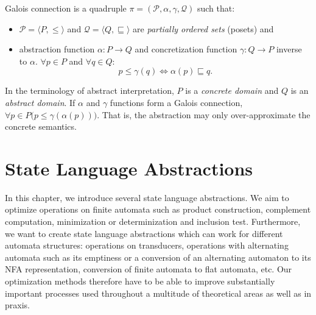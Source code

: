 \begin{definition} \hfill \newline
Galois connection is a quadruple $\pi = (\mathcal{P}, \alpha, \gamma, \mathcal{Q})$ such that:

\begin{itemize}
    \item $\mathcal{P} = \langle P, \leq \rangle$ and $\mathcal{Q} = \langle Q, \sqsubseteq \rangle$ are \emph{partially ordered sets} (posets) and
    \item abstraction function $\alpha : P \rightarrow Q$ and concretization function $\gamma : Q \rightarrow P$ inverse to $\alpha$. $\forall p \in P$ and $\forall q \in Q$:
    \[
        p \leq \gamma(q) \Leftrightarrow \alpha(p) \sqsubseteq q \text{.}
    \]
\end{itemize}

\end{definition}

In the terminology of abstract interpretation, $P$ is a \emph{concrete domain} and $Q$ is an \emph{abstract domain}. If $\alpha$ and $\gamma$ functions form a Galois connection, $\forall p \in P \bigr( p \leq \gamma(\alpha(p)) \bigr)$. That is, the abstraction may only over-approximate the concrete semantics.


\chapter{State Language Abstractions}

In this chapter, we introduce several state language abstractions. We aim to optimize operations on finite automata such as product construction, complement computation, minimization or determinization and inclusion test. Furthermore, we want to create state language abstractions which can work for different automata structures: operations on transducers, operations with alternating automata such as its emptiness or a conversion of an alternating automaton to its NFA representation, conversion of finite automata to flat automata, etc. Our optimization methods therefore have to be able to improve substantially important processes used throughout a multitude of theoretical areas as well as in praxis.


